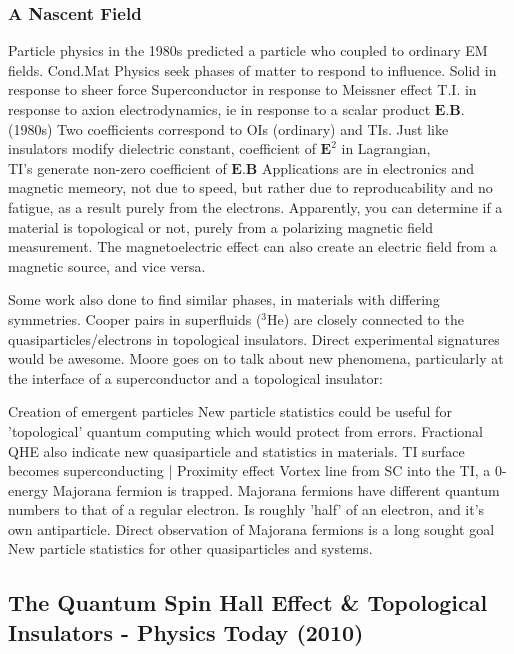 \documentclass{article} %
\begin{document}
	\subsubsection{A Nascent Field}
	\begin{outline}
		\1 Particle physics in the 1980s predicted a particle who coupled to ordinary EM fields.
		\1 Cond.Mat Physics seek phases of matter to respond to influence. 
			\2 Solid in response to sheer force
			\2 Superconductor in response to Meissner effect
			\2 T.I. in response to axion electrodynamics, ie in response to a scalar product $\textbf{E}.\textbf{B}$. (1980s)
				\3 Two coefficients correspond to OIs (ordinary) and TIs.
		\1 Just like insulators modify dielectric constant, coefficient of $\textbf{E}^2$ in Lagrangian, \\TI's generate non-zero coefficient of $\textbf{E.B}$
		\1 Applications are in electronics and magnetic memeory, not due to speed, but rather due to reproducability and no fatigue, as a result purely from the electrons.
		\1 Apparently, you can determine if a material is topological or not, purely from a polarizing magnetic field measurement.
		\1 The magnetoelectric effect can also create an electric field from a magnetic source, and vice versa. 
		
		\1 Some work also done to find similar phases, in materials with differing symmetries. Cooper pairs in superfluids ($^3$He) are closely connected to the quasiparticles/electrons in topological insulators. Direct experimental signatures would be awesome.
		\1 Moore goes on to talk about new phenomena, particularly at the interface of a superconductor and a topological insulator:
		
			\2 Creation of emergent particles
			\2 New particle statistics could be useful for 'topological' quantum computing which would protect from errors.
			\2 Fractional QHE also indicate new quasiparticle and statistics in materials.
			\2 TI surface becomes superconducting | Proximity effect
				\3 Vortex line from SC into the TI, a 0-energy Majorana fermion is trapped.
				\3 Majorana fermions have different quantum numbers to that of a regular electron.
				\3 Is roughly 'half' of an electron,  and it's own antiparticle.
			\2 Direct observation of Majorana fermions is a long sought goal
			\2 New particle statistics for other quasiparticles and systems. 
	\end{outline} 

\subsection{The Quantum Spin Hall Effect \& Topological Insulators \cite{qi_quantum_2010} - Physics Today (2010)}
\end{document}
